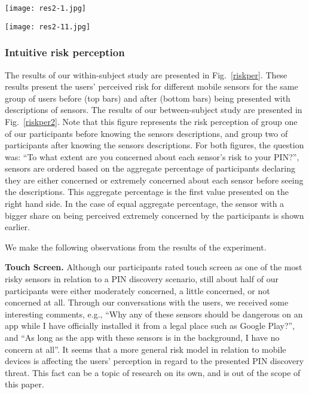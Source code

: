 \documentclass[10pt,twocolumn]{article}
\begin{document}
\begin{figure*}[!t]
	\centering
    \texttt{[image: res2-1.jpg]}
	\caption{Users' perceived risk for different mobile sensors for within-subject approach.}
	\label{riskper}
\end{figure*}
\begin{figure*}[!t]
	\centering
    \texttt{[image: res2-11.jpg]}
	\caption{Users' perceived risk for different mobile sensors for between-subject approach.} 
	\label{riskper2}
\end{figure*}
\subsubsection{Intuitive risk perception}
The results of our within-subject study are presented in Fig.~\ref{riskper}. 
These results present the users' perceived risk for different mobile sensors for the same group of users before (top bars) and after (bottom bars) being presented with descriptions of sensors. 
The results of our between-subject study are presented in Fig.~\ref{riskper2}. 
Note that this figure represents the risk perception of group one of our participants before knowing the sensors descriptions, and group two of participants after knowing the sensors descriptions.
For both figures, the question was: ``To what extent are you concerned about each sensor's risk to your PIN?'', sensors are ordered based on the aggregate percentage of participants declaring they are either concerned or extremely concerned about each sensor before seeing the descriptions. This aggregate percentage is the first value presented on the right hand side. In the case of equal aggregate percentage, the sensor with a bigger share on being perceived extremely concerned by the participants is shown earlier.

We make the following observations from the results of the experiment.

\textbf{Touch Screen.} Although our participants rated touch screen as one of the most risky sensors in relation to a PIN discovery scenario, still about half of our participants were either moderately concerned, a little concerned, or not concerned at all. 
Through our conversations with the users, we received some interesting comments, e.g., ``Why any of these sensors should be dangerous on an app while I have officially installed it from a legal place such as Google Play?'', and ``As long as the app with these sensors is in the background, I have no concern at all''. It seems that a more general risk model in relation to mobile devices is affecting the users' perception in regard to the presented PIN discovery threat. This fact can be a topic of research on its own, and is out of the scope of this paper.     
\end{document}
